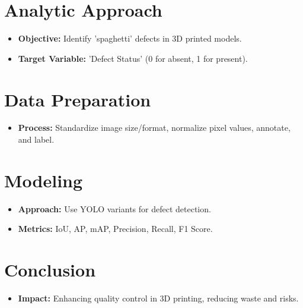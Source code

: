 \documentclass[12pt,a4paper]{article}
\begin{document}
\section{Analytic Approach}
\begin{itemize}
    \item \textbf{Objective:} Identify 'spaghetti' defects in 3D printed models.
    \item \textbf{Target Variable:} 'Defect Status' (0 for absent, 1 for present).
\end{itemize}

\section{Data Preparation}
\begin{itemize}
    \item \textbf{Process:} Standardize image size/format, normalize pixel values, annotate, and label.
\end{itemize}

\section{Modeling}
\begin{itemize}
    \item \textbf{Approach:} Use YOLO variants for defect detection.
    \item \textbf{Metrics:} IoU, AP, mAP, Precision, Recall, F1 Score.
\end{itemize}

\section{Conclusion}
\begin{itemize}
    \item \textbf{Impact:} Enhancing quality control in 3D printing, reducing waste and risks.
\end{itemize}
\end{document}
